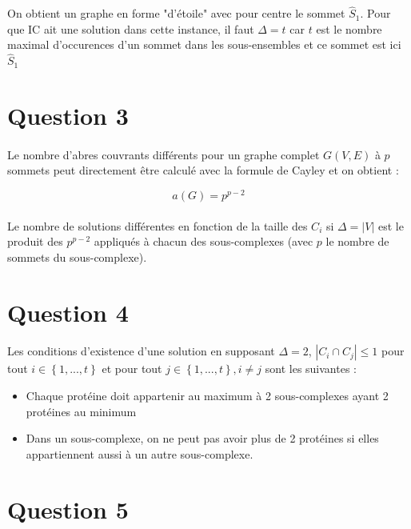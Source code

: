 \documentclass[11pt]{article}
\begin{document}
On obtient un graphe en forme "d'étoile" avec pour centre le sommet $\widehat{S}_1$. Pour que IC ait une solution
dans cette instance, il faut $\Delta = t$ car $t$ est le nombre maximal d'occurences d'un sommet dans les sous-ensembles
et ce sommet est ici $\widehat{S}_1$

\section{Question 3}
\paragraph{}
Le nombre d'abres couvrants différents pour un graphe complet $G(V,E)$ à $p$ sommets peut directement être calculé
avec la formule de Cayley et on obtient :

\begin{equation}
	a(G) = p^{p-2} 
\end{equation}

\paragraph{}
Le nombre de solutions différentes en fonction de la taille des $C_i$ si $\Delta = |V|$
est le produit des $p^{p-2}$ appliqués à chacun des sous-complexes (avec $p$ le 
nombre de sommets du sous-complexe).

\section{Question 4}
\paragraph{}
Les conditions d'existence d'une solution en supposant $\Delta=2$, $|C_i \cap C_j| \leq 1$ pour tout $i \in \left\{1,...,t\right\}$ et pour tout
$j \in \left\{1,...,t\right\} , i\ne j$ sont les suivantes :
\begin{itemize}
    \item Chaque protéine doit appartenir au maximum à 2 sous-complexes ayant
2 protéines au minimum
    \item Dans un sous-complexe, on ne peut pas avoir plus de 2 protéines si elles
appartiennent aussi à un autre sous-complexe.
\end{itemize}

\section{Question 5}
\end{document}
